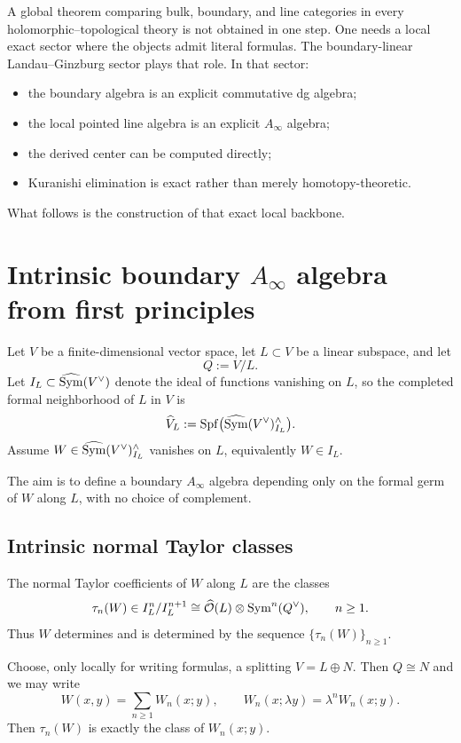A global theorem comparing bulk, boundary, and line categories in every holomorphic--topological theory is not obtained in one step. One needs a local exact sector where the objects admit literal formulas. The boundary-linear Landau--Ginzburg sector plays that role. In that sector:
\begin{itemize}[leftmargin=1.8em]
\item the boundary algebra is an explicit commutative dg algebra;
\item the local pointed line algebra is an explicit $A_\infty$ algebra;
\item the derived center can be computed directly;
\item Kuranishi elimination is exact rather than merely homotopy-theoretic.
\end{itemize}
What follows is the construction of that exact local backbone.


\section{Intrinsic boundary $A_\infty$ algebra from first principles}%

Let $V$ be a finite-dimensional vector space, let $L\subset V$ be a linear subspace, and let
\[
Q:=V/L.
\]
Let $I_L\subset \widehat{\operatorname{Sym}}(V^\vee)$ denote the ideal of functions vanishing on $L$, so the completed formal neighborhood of $L$ in $V$ is
\[
\widehat{V}_L:=\operatorname{Spf}\bigl(\widehat{\operatorname{Sym}}(V^\vee)^\wedge_{I_L}\bigr).
\]
Assume $W\in \widehat{\operatorname{Sym}}(V^\vee)^\wedge_{I_L}$ vanishes on $L$, equivalently $W\in I_L$.

The aim is to define a boundary $A_\infty$ algebra depending only on the formal germ of $W$ along $L$, with no choice of complement.

\subsection{Intrinsic normal Taylor classes}

The normal Taylor coefficients of $W$ along $L$ are the classes
\[
\tau_n(W)\in I_L^n/I_L^{n+1}\cong \widehat{\mathcal O}(L)\otimes \operatorname{Sym}^n(Q^\vee),
\qquad n\ge 1.
\]
Thus $W$ determines and is determined by the sequence $\{\tau_n(W)\}_{n\ge 1}$.

Choose, only locally for writing formulas, a splitting $V=L\oplus N$. Then $Q\cong N$ and we may write
\[
W(x,y)=\sum_{n\ge 1} W_n(x;y),
\qquad
W_n(x;\lambda y)=\lambda^n W_n(x;y).
\]
Then $\tau_n(W)$ is exactly the class of $W_n(x;y)$.

